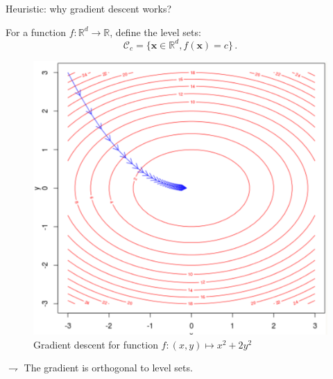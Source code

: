 \documentclass[9pt]{beamer}
\newcommand\R{\mathds{R}}
\newcommand\bx{\mathbf{x}}
\begin{document}
\begin{frame}{Heuristic: why gradient descent works?}
	
For a function $f: \R^d \to \R$, define the \alert{level sets}: 
$$
\mathcal{C}_c = \{ \bx \in \R^d, f(\bx) = c\}\,.
$$
	
	
\begin{center}
\begin{figure}
\includegraphics[scale=0.4]{./gradient_descent_iterations.png}
\caption{Gradient descent for function $f: (x,y) \mapsto x^2 + 2 y^2$}
\end{figure}
\end{center}
	
$\rightharpoondown$  The gradient is \alert{orthogonal to level sets}. 

\end{frame}
\end{document}
